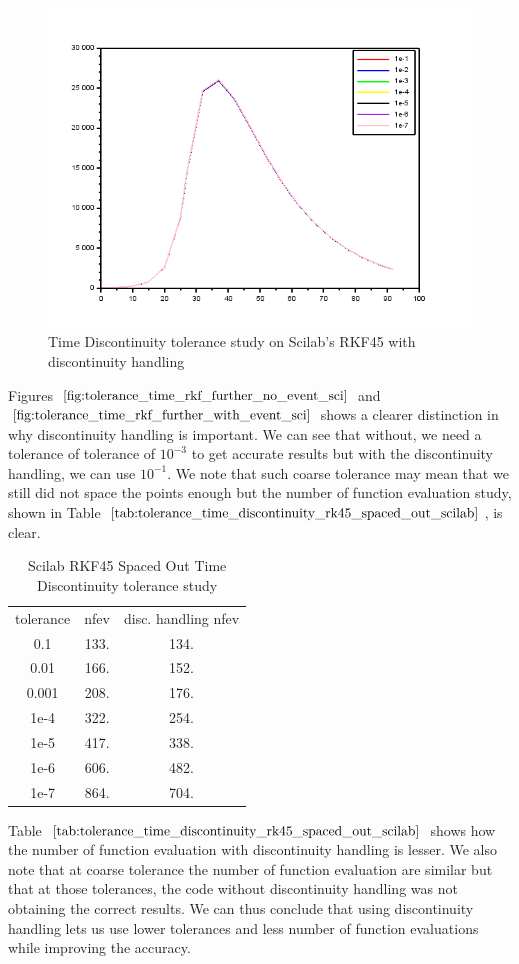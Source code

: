 \begin{figure}[h]
	\centering
	\includegraphics[width=0.7\linewidth]{./figures/tolerance_time_rkf_further_with_event_sci}
	\caption{Time Discontinuity tolerance study on Scilab's RKF45 with discontinuity handling}
	\label{fig:tolerance_time_rkf_further_with_event_sci}
\end{figure}

Figures $\ref{fig:tolerance_time_rkf_further_no_event_sci}$ and $\ref{fig:tolerance_time_rkf_further_with_event_sci}$ shows a clearer distinction in why discontinuity handling is important. We can see that without, we need a tolerance of tolerance of $10^{-3}$ to get accurate results but with the discontinuity handling, we can use $10^{-1}$. We note that such coarse tolerance may mean that we still did not space the points enough but the number of function evaluation study, shown in Table $\ref{tab:tolerance_time_discontinuity_rk45_spaced_out_scilab}$, is clear.

\begin{table}[h]
\caption {Scilab RKF45 Spaced Out Time Discontinuity tolerance study} 
\label{tab:tolerance_time_discontinuity_rk45_spaced_out_scilab} 
\begin{center}
\begin{tabular}{ c c c }
tolerance & nfev  & disc. handling nfev \\ 
   0.1   & 133. & 134. \\
   0.01  & 166. & 152. \\
   0.001 & 208. & 176. \\
   1e-4  & 322. & 254. \\
   1e-5  & 417. & 338. \\
   1e-6  & 606. & 482. \\
   1e-7  & 864. & 704. \\
\end{tabular}
\end{center}
\end{table}

Table $\ref{tab:tolerance_time_discontinuity_rk45_spaced_out_scilab}$ shows how the number of function evaluation with discontinuity handling is lesser. We also note that at coarse tolerance the number of function evaluation are similar but that at those tolerances, the code without discontinuity handling was not obtaining the correct results. We can thus conclude that using discontinuity handling lets us use lower tolerances and less number of function evaluations while improving the accuracy.
